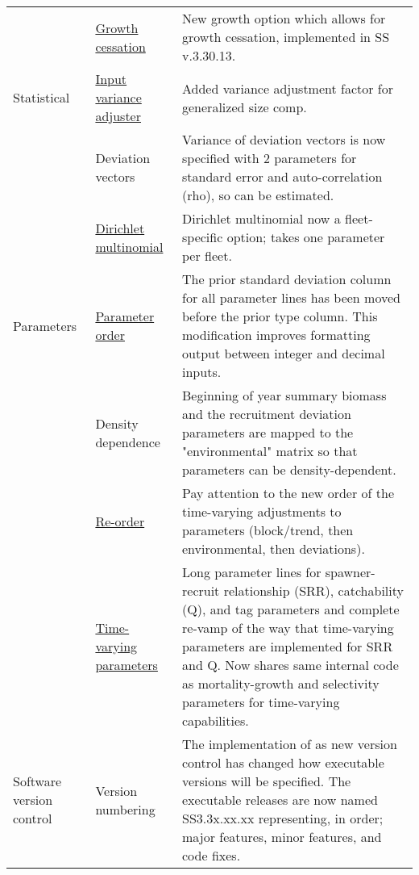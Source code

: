 \begin{center}
{\begin{longtable}{p{2cm} p{3cm} p{10cm}}
		    & \hyperlink{GrowthCessation}{Growth cessation} & 
		    New growth option which allows for growth cessation, implemented in SS v.3.30.13. \\

		Statistical 
			& \hyperlink{GcompVar}{Input variance adjuster} & 
				Added variance adjustment factor for generalized size comp. \\
			
			& Deviation vectors & 
				Variance of deviation vectors is now specified with 2 parameters for standard error and auto-correlation (rho), so can be estimated.\\
				
			& \hyperlink{Dirichlet}{Dirichlet multinomial} & 
				Dirichlet multinomial now a fleet-specific option; takes one parameter per fleet. \\

		Parameters 
			& \hyperlink{paraOrder}{Parameter order} & The prior standard deviation column for all parameter lines has been moved before the prior type column.  This modification improves formatting output between integer and decimal inputs.\\ 

			& Density dependence & 
				Beginning of year summary biomass and the recruitment deviation parameters are mapped to the "environmental" matrix so that parameters can be density-dependent.\\
				
			& \hyperlink{tvOrder}{Re-order} & 
				Pay attention to the new order of the time-varying adjustments to parameters (block/trend, then environmental, then deviations). \\
			
			& \hyperlink{time-vary}{Time-varying parameters} & 
				Long parameter lines for spawner-recruit relationship (SRR), catchability (Q), and tag parameters and complete re-vamp of the way that time-varying parameters are implemented for SRR and Q.  Now shares same internal code as mortality-growth and selectivity parameters for time-varying capabilities.\\

		 Software version control
			 & Version numbering	& The implementation of as new version control has changed how executable versions will be specified.  The executable releases are now named SS3.3x.xx.xx representing, in order; major features, minor features, and code fixes. \\
		 \hline
	\end{longtable}}
\end{center}
		
